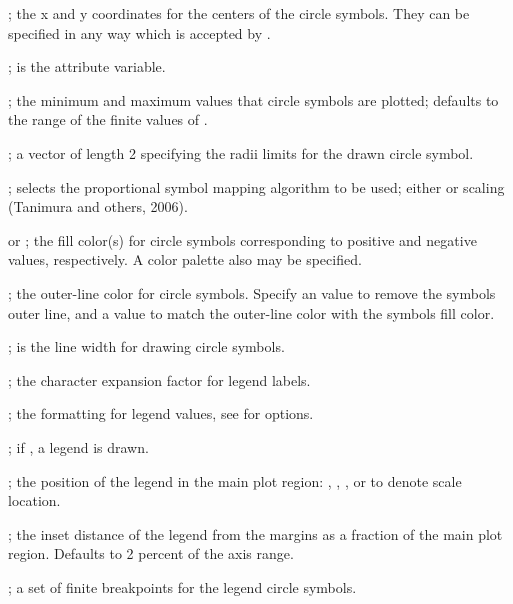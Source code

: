 \documentclass[a4paper]{book}
\begin{document}
\begin{Arguments}
\begin{ldescription}
\item[\code{x, y}] ; the x and y coordinates for the centers of the circle symbols. They can be specified in any way which is accepted by .
\item[\code{z}] ; is the attribute variable.
\item[\code{zlim}] ; the minimum and maximum  values that circle symbols are plotted; defaults to the range of the finite values of .
\item[\code{inches}] ; a vector of length 2 specifying the radii limits for the drawn circle symbol.
\item[\code{scaling}] ; selects the proportional symbol mapping algorithm to be used; either  or  scaling (Tanimura and others, 2006).
\item[\code{bg.pos, bg.neg}]  or ; the fill color(s) for circle symbols corresponding to positive and negative  values, respectively.
A color palette also may be specified.
\item[\code{fg}] ; the outer-line color for circle symbols.
Specify an  value to remove the symbols outer line, and a  value to match the outer-line color with the symbols fill color.
\item[\code{lwd}] ; is the line width for drawing circle symbols.
\item[\code{cex}] ; the character expansion factor for legend labels.
\item[\code{format}] ; the formatting for legend values, see  for options.
\item[\code{draw.legend}] ; if , a legend is drawn.
\item[\code{loc}] ; the position of the legend in the main plot region: , , , or  to denote scale location.
\item[\code{inset}] ; the inset distance of the legend from the margins as a fraction of the main plot region.
Defaults to 2 percent of the axis range.
\item[\code{breaks}] ; a set of finite breakpoints for the legend circle symbols.

\end{ldescription}
\end{Arguments}
\end{document}
